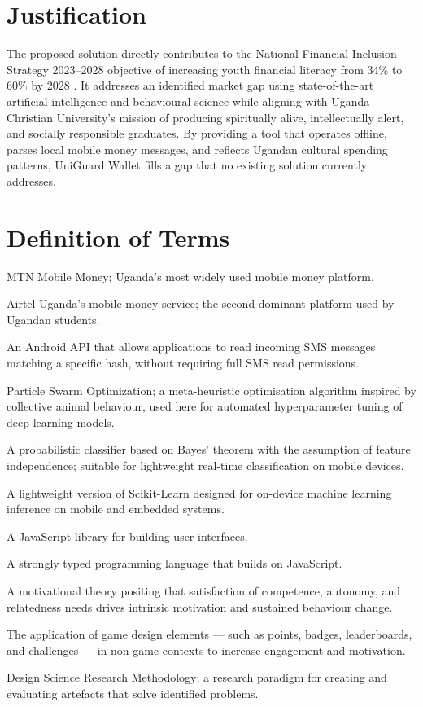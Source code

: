 \documentclass[12pt]{report}
\begin{document}
\section{Justification}

The proposed solution directly contributes to the National Financial Inclusion Strategy 2023--2028 objective of increasing youth financial literacy from 34\% to 60\% by 2028 \citep{MoFPED2023}. It addresses an identified market gap using state-of-the-art artificial intelligence and behavioural science while aligning with Uganda Christian University's mission of producing spiritually alive, intellectually alert, and socially responsible graduates. By providing a tool that operates offline, parses local mobile money messages, and reflects Ugandan cultural spending patterns, UniGuard Wallet fills a gap that no existing solution currently addresses.

\section{Definition of Terms}

\begin{description}[leftmargin=3cm, style=nextline]
    \item[MTN MoMo] MTN Mobile Money; Uganda's most widely used mobile money platform.
    \item[Airtel Money] Airtel Uganda's mobile money service; the second dominant platform used by Ugandan students.
    \item[SMS Retriever API] An Android API that allows applications to read incoming SMS messages matching a specific hash, without requiring full SMS read permissions.
            \item[PSO] Particle Swarm Optimization; a meta-heuristic optimisation algorithm inspired by collective animal behaviour, used here for automated hyperparameter tuning of deep learning models.
    \item[Gaussian Naive Bayes] A probabilistic classifier based on Bayes' theorem with the assumption of feature independence; suitable for lightweight real-time classification on mobile devices.
    \item[Joblib serialized models] A lightweight version of Scikit-Learn designed for on-device machine learning inference on mobile and embedded systems.
    \item[React] A JavaScript library for building user interfaces.
\item[TypeScript] A strongly typed programming language that builds on JavaScript.
    \item[Self-Determination Theory (SDT)] A motivational theory positing that satisfaction of competence, autonomy, and relatedness needs drives intrinsic motivation and sustained behaviour change.
    \item[Gamification] The application of game design elements --- such as points, badges, leaderboards, and challenges --- in non-game contexts to increase engagement and motivation.
    \item[DSRM] Design Science Research Methodology; a research paradigm for creating and evaluating artefacts that solve identified problems.
\end{description}
\end{document}
